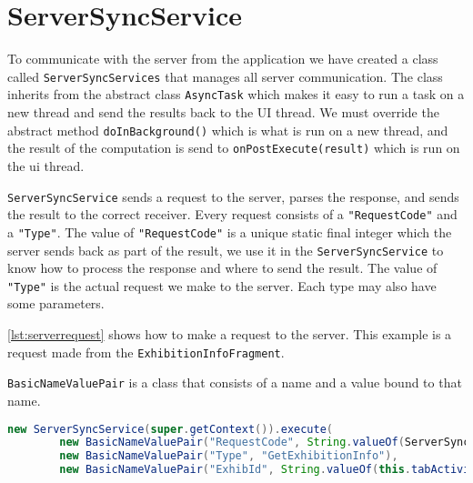 \section{ServerSyncService}

To communicate with the server from the application we have created a class called \lstinline|ServerSyncServices| that manages all server communication. The class inherits from the abstract class \lstinline|AsyncTask| which makes it easy to run a task on a new thread and send the results back to the UI thread. We must override the abstract method \lstinline|doInBackground()| which is what is run on a new thread, and the result of the computation is send to \lstinline|onPostExecute(result)| which is run on the \ac{ui} thread.

\lstinline|ServerSyncService| sends a request to the server, parses the response, and sends the result to the correct receiver. Every request consists of a \lstinline|"RequestCode"| and a \lstinline|"Type"|. The value of \lstinline|"RequestCode"| is a unique static final integer which the server sends back as part of the result, we use it in the \lstinline|ServerSyncService| to know how to process the response and where to send the result. The value of \lstinline|"Type"| is the actual request we make to the server. Each type may also have some parameters.

\autoref{lst:serverrequest} shows how to make a request to the server. This example is a request made from the \lstinline|ExhibitionInfoFragment|.

\lstinline|BasicNameValuePair| is a class that consists of a name and a value bound to that name. 

\begin{lstlisting}[language=java, label=lst:serverrequest, caption={Get exhibition information request}]
new ServerSyncService(super.getContext()).execute(
        new BasicNameValuePair("RequestCode", String.valueOf(ServerSyncService.GET_EXHIBITION_INFO)),
        new BasicNameValuePair("Type", "GetExhibitionInfo"),
        new BasicNameValuePair("ExhibId", String.valueOf(this.tabActivity.getExhibId());
\end{lstlisting}

